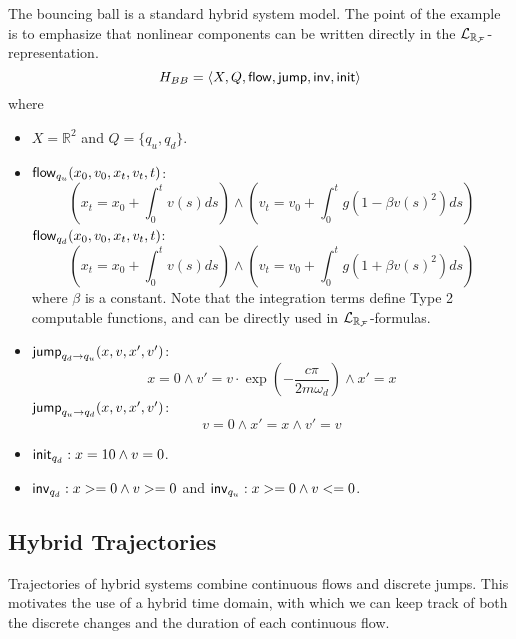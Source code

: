 \documentclass[12pt]{article}
\begin{document}
\begin{example}
The bouncing ball is a standard hybrid system model. The point of the example is to emphasize that nonlinear components can be written directly in the $\mathcal{L}_{\mathbb{R}_{\mathcal{F}}}$-representation.
$$H_{BB}= \langle X, Q, \mathsf{flow}, \mathsf{jump}, \mathsf{inv}, \mathsf{init}\rangle$$
where
\begin{itemize}
\item $X = \mathbb{R}^2$ and $Q = \{q_u, q_d\}$.
\item $\mathsf{flow}_{q_u}(x_0, v_0, x_t, v_t, t)$:
$$(x_t = x_0 + \int_0^{t} v(s) ds) \wedge (v_t = v_0 + \int_0^t g(1-\beta v(s)^2) ds)$$
$\mathsf{flow}_{q_d}(x_0, v_0, x_t, v_t, t)$:
$$(x_t = x_0 + \int_0^{t} v(s) ds) \wedge (v_t = v_0 + \int_0^t g(1+\beta v(s)^2) ds)$$
where
$\beta$ is a constant. Note that the integration terms define Type 2 computable functions, and can be directly used in $\mathcal{L}_{\mathbb{R}_{\mathcal{F}}}$-formulas.
\item $\mathsf{jump}_{q_d \rightarrow q_u} (x, v, x', v')$:
$$x= 0 \wedge v' = v\cdot\exp(-\frac{c\pi}{2m\omega_d}) \wedge x'=x$$
$\mathsf{jump}_{q_u \rightarrow q_d} (x, v, x', v')$:
$$v= 0 \wedge x' = x \wedge v' = v$$
\item $\mathsf{init}_{q_d}: x=10 \wedge v=0$.
\item $\mathsf{inv}_{q_d}: x>=0 \wedge v>=0$ and $\mathsf{inv}_{q_u}: x>=0 \wedge v<=0$.  
\end{itemize}
\end{example}

\subsection{Hybrid Trajectories}

Trajectories of hybrid systems combine continuous flows and discrete jumps. This motivates the use of a hybrid time domain, with which we can keep track of both the discrete changes and the duration of each continuous flow.
\end{document}
